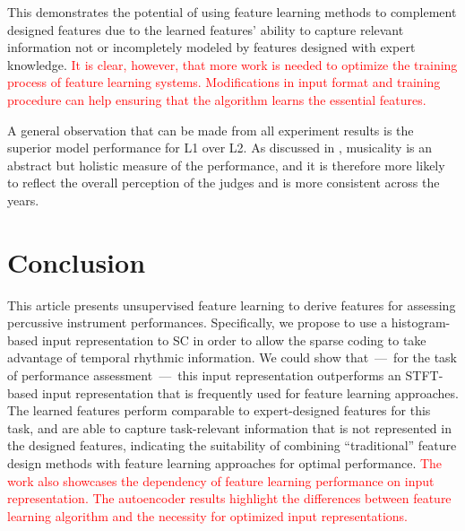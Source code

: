 \documentclass{ws-ijsc}
\newcommand{\highlight}[1]{\textcolor{red}{#1}}
\begin{document}
This demonstrates the potential of using feature learning methods to complement designed features due to the learned features' ability to capture relevant information not or incompletely modeled by features designed with expert knowledge. \highlight{It is clear, however, that more work is needed to optimize the training process of feature learning systems. Modifications in input format and training procedure can help ensuring that the algorithm learns the essential features.}

A general observation that can be made from all experiment results is the superior model performance for L1 over L2. As discussed in \cite{Wu2016}, musicality is an abstract but holistic measure of the performance, and it is therefore more likely to reflect the overall perception of the judges and is more consistent across the years. %


\section{Conclusion}\label{sec:conclusion}
This article presents unsupervised feature learning to derive features for assessing percussive instrument performances. Specifically, we propose to use a histogram-based input representation to SC in order to allow the sparse coding to take advantage of temporal rhythmic information. We could show that~---~for the task of performance assessment~---~this input representation outperforms an STFT-based input representation that is frequently used for feature learning approaches. The learned features perform comparable to expert-designed features for this task, and are able to capture task-relevant information that is not represented in the designed features, indicating the suitability of combining ``traditional'' feature design methods with feature learning approaches for optimal performance. \highlight{The work also showcases the dependency of feature learning performance on input representation. The autoencoder results highlight the differences between feature learning algorithm and the necessity for optimized input representations.}
\end{document}
